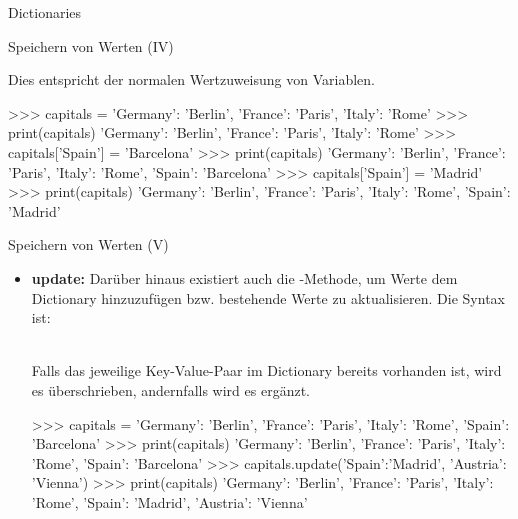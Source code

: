 \begin{subsection}{Dictionaries}
\begin{frame}[fragile]{Speichern von Werten (IV)}
\begin{itemize}
                
                Dies entspricht der normalen Wertzuweisung von Variablen.
            
\begin{pyconcode}
>>> capitals = {'Germany': 'Berlin', 'France': 'Paris', 'Italy': 'Rome'}
>>> print(capitals)
{'Germany': 'Berlin', 'France': 'Paris', 'Italy': 'Rome'}
>>> capitals['Spain'] = 'Barcelona'
>>> print(capitals)
{'Germany': 'Berlin', 'France': 'Paris', 'Italy': 'Rome', 'Spain': 'Barcelona'}
>>> capitals['Spain'] = 'Madrid'
>>> print(capitals)
{'Germany': 'Berlin', 'France': 'Paris', 'Italy': 'Rome', 'Spain': 'Madrid'}
\end{pyconcode}    
                
            \end{itemize}
    
        \end{frame}
        
        \begin{frame}[fragile]{Speichern von Werten (V)}
            
            \begin{itemize}
                \item \textbf{update:} Darüber hinaus existiert auch die -Methode, um Werte dem Dictionary hinzuzufügen bzw. bestehende Werte zu aktualisieren. Die Syntax ist:\\~\
                
                
                Falls das jeweilige Key-Value-Paar im Dictionary bereits vorhanden ist, wird es überschrieben, andernfalls wird es ergänzt.
            
\begin{pyconcode}
>>> capitals = {'Germany': 'Berlin', 'France': 'Paris', 'Italy': 'Rome', 'Spain': 'Barcelona'}
>>> print(capitals)
{'Germany': 'Berlin', 'France': 'Paris', 'Italy': 'Rome', 'Spain': 'Barcelona'}
>>> capitals.update({'Spain':'Madrid', 'Austria': 'Vienna'})
>>> print(capitals)
{'Germany': 'Berlin', 'France': 'Paris', 'Italy': 'Rome', 'Spain': 'Madrid', 'Austria': 'Vienna'}
\end{pyconcode}    
                
            \end{itemize}
    
        \end{frame}
        

\end{subsection}
